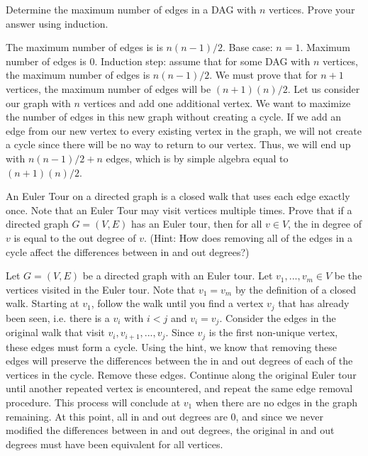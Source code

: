 \documentclass[solution, letterpaper]{cs20}
\begin{document}



\subproblem Determine the maximum number of edges in a DAG with $n$ vertices.
\subproblem Prove your answer using induction.  

\begin{solution}
\subsolution The maximum number of edges is is $n(n-1)/2$. 
\subsolution Base case: $n = 1$. Maximum number of edges is 0. 
Induction step: assume that for some DAG with $n$ vertices, the maximum number of edges is $n(n-1)/2$. We must prove that for $n+1$ vertices, the maximum number of edges will be $(n+1)(n)/2$. Let us consider our graph with $n$ vertices and add one additional vertex.  We want to maximize the number of edges in this new graph without creating a cycle. If we add an edge from our new vertex to every existing vertex in the graph, we will not create a cycle since there will be no way to return to our vertex. Thus, we will end up with $n(n-1)/2 + n$ edges, which is by simple algebra equal to $(n+1)(n)/2$. 
\end{solution}


An Euler Tour on a directed graph is a closed walk that uses each edge exactly once. Note that an Euler Tour may visit vertices multiple times. Prove that if a directed graph $G = (V, E)$ has an Euler tour, then for all $v \in V$, the in degree of $v$ is equal to the out degree of $v$. (Hint: How does removing all of the edges in a cycle affect the differences between in and out degrees?)

\begin{solution}
Let $G = (V, E)$ be a directed graph with an Euler tour. Let $v_1, ..., v_m \in V$ be the vertices visited in the Euler tour. Note that $v_1 = v_m$ by the definition of a closed walk. Starting at $v_1$, follow the walk until you find a vertex $v_j$ that has already been seen, i.e. there is a $v_i$ with $i < j$ and $v_i = v_j$. Consider the edges in the original walk that visit $v_i, v_{i+1}, ..., v_j$. Since $v_j$ is the first non-unique vertex, these edges must form a cycle. Using the hint, we know that removing these edges will preserve the differences between the in and out degrees of each of the vertices in the cycle. Remove these edges. Continue along the original Euler tour until another repeated vertex is encountered, and repeat the same edge removal procedure. This process will conclude at $v_1$ when there are no edges in the graph remaining. At this point, all in and out degrees are 0, and since we never modified the differences between in and out degrees, the original in and out degrees must have been equivalent for all vertices.

\end{solution}
\end{document}
